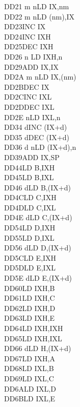\begin{multicols}{3}
{\begin{tabbing}
    DD21 m n\>LD IX,nm\\
    DD22 m n\>LD (nm),IX\\
    DD23\>INC IX\\
    DD24\>INC IXH\UNDOC\\
    DD25\>DEC IXH\UNDOC\\
    DD26 n \>LD IXH,n\UNDOC\\
    DD29\>ADD IX,IX\\
    DD2A m n\>LD IX,(nm)\\
    DD2B\>DEC IX\\
    DD2C\>INC IXL\UNDOC\\
    DD2D\>DEC IXL\UNDOC\\
    DD2E n\>LD IXL,n\UNDOC\\
    DD34 d\>INC (IX+d)\\
    DD35 d\>DEC (IX+d)\\
    DD36 d n\>LD (IX+d),n\\
    DD39\>ADD IX,SP\\
    DD44\>LD B,IXH\UNDOC\\
    DD45\>LD B,IXL\UNDOC\\
    DD46 d\>LD B,(IX+d)\\
    DD4C\>LD C,IXH\UNDOC\\
    DD4D\>LD C,IXL\UNDOC\\
    DD4E d\>LD C,(IX+d)\\
    DD54\>LD D,IXH\UNDOC\\
    DD55\>LD D,IXL\UNDOC\\
    DD56 d\>LD D,(IX+d)\\
    DD5C\>LD E,IXH\UNDOC\\
    DD5D\>LD E,IXL\UNDOC\\
    DD5E d\>LD E,(IX+d)\\
    DD60\>LD IXH,B\UNDOC\\
    DD61\>LD IXH,C\UNDOC\\
    DD62\>LD IXH,D\UNDOC\\
    DD63\>LD IXH,E\UNDOC\\
    DD64\>LD IXH,IXH\UNDOC\\
    DD65\>LD IXH,IXL\UNDOC\\
    DD66 d\>LD H,(IX+d)\\
    DD67\>LD IXH,A\UNDOC\\
    DD68\>LD IXL,B\UNDOC\\
    DD69\>LD IXL,C\UNDOC\\
    DD6A\>LD IXL,D\UNDOC\\
    DD6B\>LD IXL,E\UNDOC\\

\end{tabbing}}
\end{multicols}
